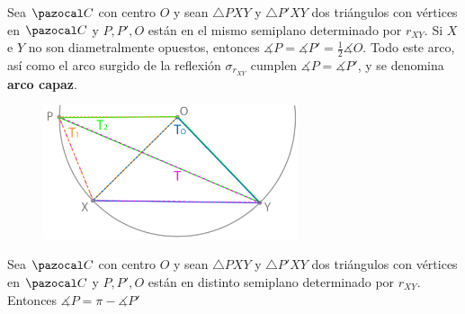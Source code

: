  Sea $\C$ con centro $O$ y sean $\triangle PXY$ y $\triangle P'XY$ dos triángulos con vértices en $\C$ y $P, P', O$ están en el mismo semiplano determinado por $r_{XY}$. Si $X$ e $Y$ no son diametralmente opuestos, entonces $\measuredangle P = \measuredangle P' = \frac{1}{2}\measuredangle O$. Todo este arco, así como el arco surgido de la reflexión $\sigma_{r_{XY}}$ cumplen  $\measuredangle P = \measuredangle P'$, y se denomina \textbf{arco capaz}.
\begin{figure}[H]
	\centering
	\includegraphics[width=7.5cm]{figuras/8-10.png}
	\vspace{-1em}
\end{figure}
\obligatorio{} 

 Sea $\C$ con centro $O$ y sean $\triangle PXY$ y $\triangle P'XY$ dos triángulos con vértices en $\C$ y $P, P', O$ están en distinto semiplano determinado por $r_{XY}$. Entonces $\measuredangle P = \pi - \measuredangle P'$ 

